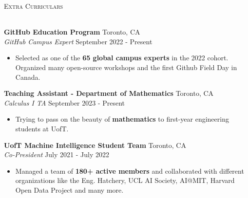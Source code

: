 \documentclass[a4paper]{article}
\newcommand{\lineunder} {
    \vspace*{-8pt} \\
    \hspace*{-18pt} \hrulefill \\
}
\newcommand{\header} [1] {
    {\hspace*{-18pt}\vspace*{6pt} \textsc{#1}}
    \vspace*{-6pt} \lineunder
}
\begin{document}

\header{Extra Curriculars}
\vspace{1mm}

\textbf{GitHub Education Program} \hfill Toronto, CA\\
\textit{GitHub Campus Expert} \hfill September 2022 - Present\\
\vspace{-3mm}
\begin{itemize} \itemsep 0.5pt
	\item Selected as one of the \textbf{65 global campus experts} in the 2022 cohort. Organized many open-source workshops and the first Github Field Day in Canada.
\end{itemize}

\textbf{Teaching Assistant - Department of Mathematics} \hfill Toronto, CA\\
\textit{Calculus I TA} \hfill September 2023 - Present\\
\vspace{-3mm}
\begin{itemize} \itemsep 0.5pt
	\item Trying to pass on the beauty of \textbf{mathematics} to first-year engineering students at UofT.
\end{itemize}

\textbf{UofT Machine Intelligence Student Team} \hfill Toronto, CA\\
\textit{Co-President} \hfill July 2021 - July 2022\\
\vspace{-3mm}
\begin{itemize} \itemsep 0.5pt
	\item Managed a team of \textbf{180+ active members} and collaborated with different organizations like the Eng. Hatchery, UCL AI Society, AI@MIT, Harvard Open Data Project and many more.
\end{itemize}
\end{document}
